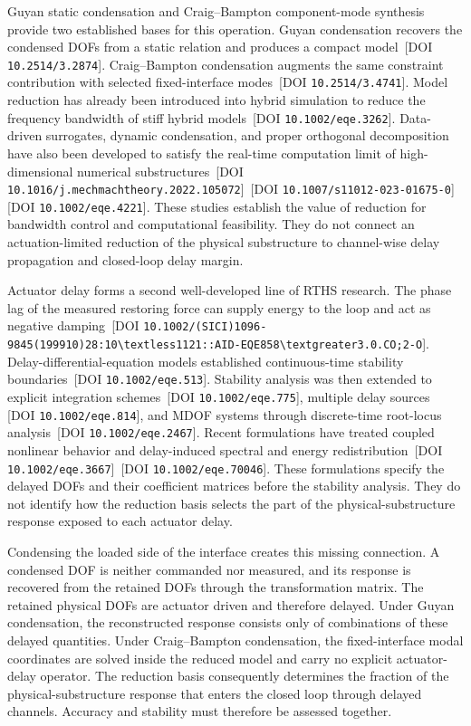 \documentclass[11pt,a4paper]{article}
\numberwithin{equation}{section}
\begin{document}
Guyan static condensation and Craig--Bampton component-mode synthesis provide two established bases for this operation. Guyan condensation recovers the condensed DOFs from a static relation and produces a compact model \cite{Guyan1965}\,[DOI \nolinkurl{10.2514/3.2874}]. Craig--Bampton condensation augments the same constraint contribution with selected fixed-interface modes \cite{CraigBampton1968}\,[DOI \nolinkurl{10.2514/3.4741}]. Model reduction has already been introduced into hybrid simulation to reduce the frequency bandwidth of stiff hybrid models \cite{Miraglia2020}\,[DOI \nolinkurl{10.1002/eqe.3262}]. Data-driven surrogates, dynamic condensation, and proper orthogonal decomposition have also been developed to satisfy the real-time computation limit of high-dimensional numerical substructures \cite{Tsokanas2022}\,[DOI \nolinkurl{10.1016/j.mechmachtheory.2022.105072}] \cite{Mucha2023}\,[DOI \nolinkurl{10.1007/s11012-023-01675-0}] \cite{Zhang2024}\,[DOI \nolinkurl{10.1002/eqe.4221}]. These studies establish the value of reduction for bandwidth control and computational feasibility. They do not connect an actuation-limited reduction of the physical substructure to channel-wise delay propagation and closed-loop delay margin.

Actuator delay forms a second well-developed line of RTHS research. The phase lag of the measured restoring force can supply energy to the loop and act as negative damping \cite{Horiuchi1999}\,[DOI \nolinkurl{10.1002/(SICI)1096-9845(199910)28:10\textless1121::AID-EQE858\textgreater3.0.CO;2-O}]. Delay-differential-equation models established continuous-time stability boundaries \cite{Wallace2005}\,[DOI \nolinkurl{10.1002/eqe.513}]. Stability analysis was then extended to explicit integration schemes \cite{ChenRicles2008}\,[DOI \nolinkurl{10.1002/eqe.775}], multiple delay sources \cite{Mercan2008}\,[DOI \nolinkurl{10.1002/eqe.814}], and MDOF systems through discrete-time root-locus analysis \cite{Zhu2015}\,[DOI \nolinkurl{10.1002/eqe.2467}]. Recent formulations have treated coupled nonlinear behavior and delay-induced spectral and energy redistribution \cite{Huang2022}\,[DOI \nolinkurl{10.1002/eqe.3667}] \cite{Huang2025}\,[DOI \nolinkurl{10.1002/eqe.70046}]. These formulations specify the delayed DOFs and their coefficient matrices before the stability analysis. They do not identify how the reduction basis selects the part of the physical-substructure response exposed to each actuator delay.

Condensing the loaded side of the interface creates this missing connection. A condensed DOF is neither commanded nor measured, and its response is recovered from the retained DOFs through the transformation matrix. The retained physical DOFs are actuator driven and therefore delayed. Under Guyan condensation, the reconstructed response consists only of combinations of these delayed quantities. Under Craig--Bampton condensation, the fixed-interface modal coordinates are solved inside the reduced model and carry no explicit actuator-delay operator. The reduction basis consequently determines the fraction of the physical-substructure response that enters the closed loop through delayed channels. Accuracy and stability must therefore be assessed together.
\end{document}
